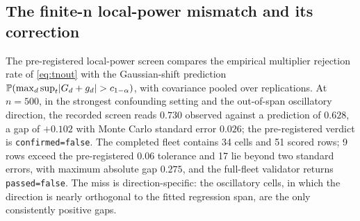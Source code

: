 \subsection{The finite-n local-power mismatch and its correction}
\label{sec:mismatch}

The pre-registered local-power screen compares the empirical multiplier rejection rate of \eqref{eq:tnout} with the Gaussian-shift prediction $\mathbb{P}(\max_d\sup_t\lvert G_d+g_d\rvert>c_{1-\alpha})$, with covariance pooled over replications. At $n=500$, in the strongest confounding setting and the out-of-span oscillatory direction, the recorded screen reads $0.730$ observed against a prediction of $0.628$, a gap of $+0.102$ with Monte Carlo standard error $0.026$; the pre-registered verdict is \texttt{confirmed=false}. The completed fleet contains 34 cells and 51 scored rows; 9 rows exceed the pre-registered $0.06$ tolerance and 17 lie beyond two standard errors, with maximum absolute gap $0.275$, and the full-fleet validator returns \texttt{passed=false}. The miss is direction-specific: the oscillatory cells, in which the direction is nearly orthogonal to the fitted regression span, are the only consistently positive gaps.

